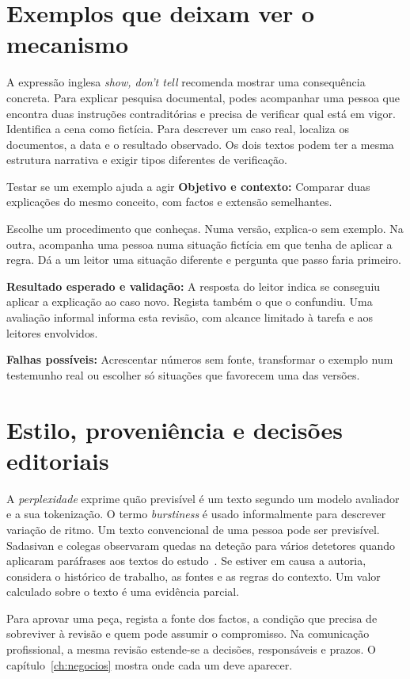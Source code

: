 \section{Exemplos que deixam ver o mecanismo}

A expressão inglesa \emph{show, don't tell} recomenda mostrar uma consequência concreta. Para explicar pesquisa documental, podes acompanhar uma pessoa que encontra duas instruções contraditórias e precisa de verificar qual está em vigor. Identifica a cena como fictícia. Para descrever um caso real, localiza os documentos, a data e o resultado observado. Os dois textos podem ter a mesma estrutura narrativa e exigir tipos diferentes de verificação.

\begin{promptlabbox}{Testar se um exemplo ajuda a agir}
\textbf{Objetivo e contexto:} Comparar duas explicações do mesmo conceito, com factos e extensão semelhantes.

Escolhe um procedimento que conheças. Numa versão, explica-o sem exemplo. Na outra, acompanha uma pessoa numa situação fictícia em que tenha de aplicar a regra. Dá a um leitor uma situação diferente e pergunta que passo faria primeiro.

\textbf{Resultado esperado e validação:} A resposta do leitor indica se conseguiu aplicar a explicação ao caso novo. Regista também o que o confundiu. Uma avaliação informal informa esta revisão, com alcance limitado à tarefa e aos leitores envolvidos.

\textbf{Falhas possíveis:} Acrescentar números sem fonte, transformar o exemplo num testemunho real ou escolher só situações que favorecem uma das versões.
\end{promptlabbox}

\section{Estilo, proveniência e decisões editoriais}

A \emph{perplexidade} exprime quão previsível é um texto segundo um modelo avaliador e a sua tokenização. O termo \emph{burstiness} é usado informalmente para descrever variação de ritmo. Um texto convencional de uma pessoa pode ser previsível. Sadasivan e colegas observaram quedas na deteção para vários detetores quando aplicaram paráfrases aos textos do estudo~\citep{sadasivan2023}. Se estiver em causa a autoria, considera o histórico de trabalho, as fontes e as regras do contexto. Um valor calculado sobre o texto é uma evidência parcial.

Para aprovar uma peça, regista a fonte dos factos, a condição que precisa de sobreviver à revisão e quem pode assumir o compromisso. Na comunicação profissional, a mesma revisão estende-se a decisões, responsáveis e prazos. O capítulo~\ref{ch:negocios} mostra onde cada um deve aparecer.
